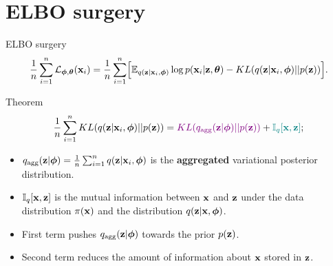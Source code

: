 \section{ELBO surgery}
\begin{frame}{ELBO surgery}
	\vspace{-0.3cm}
	\[
	    \frac{1}{n} \sum_{i=1}^n \mathcal{L}_{\boldsymbol{\phi}, \boldsymbol{\theta}}(\mathbf{x}_i) = \frac{1}{n} \sum_{i=1}^n \Bigl[ \mathbb{E}_{q(\mathbf{z} | \mathbf{x}_i, \boldsymbol{\phi})} \log p(\mathbf{x}_i | \mathbf{z}, \boldsymbol{\theta}) - KL(q(\mathbf{z} | \mathbf{x}_i, \boldsymbol{\phi}) || p(\mathbf{z})) \Bigr].
	\]
	\vspace{-0.3cm}
	\begin{block}{Theorem}
		\vspace{-0.5cm}
		\[
		    \frac{1}{n} \sum_{i=1}^n KL(q(\mathbf{z} | \mathbf{x}_i, \boldsymbol{\phi}) || p(\mathbf{z})) = {\color{violet} KL(q_{\text{agg}}(\mathbf{z} | \boldsymbol{\phi}) || p(\mathbf{z}))} + {\color{teal}\mathbb{I}_{q} [\mathbf{x}, \mathbf{z}]};
		\]
		\vspace{-0.5cm}
		\begin{itemize}
			\item $q_{\text{agg}}(\mathbf{z} | \boldsymbol{\phi}) = \frac{1}{n} \sum_{i=1}^n q(\mathbf{z} | \mathbf{x}_i, \boldsymbol{\phi})$ is the \textbf{aggregated} variational posterior distribution.
			\item $\mathbb{I}_{q} [\mathbf{x}, \mathbf{z}]$ is the mutual information between $\mathbf{x}$ and $\mathbf{z}$ under the data distribution $\pi(\mathbf{x})$ and the distribution $q(\mathbf{z} | \mathbf{x}, \boldsymbol{\phi})$.
			\item  {\color{violet} First term} pushes $q_{\text{agg}}(\mathbf{z} | \boldsymbol{\phi})$ towards the prior $p(\mathbf{z})$.
			\item {\color{teal}Second term} reduces the amount of information about $\mathbf{x}$ stored in $\mathbf{z}$. 
		\end{itemize}
	\end{block}
\end{frame}
